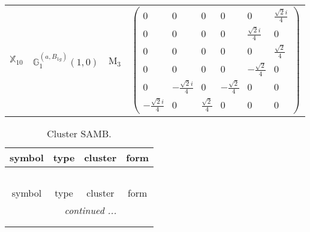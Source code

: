 \documentclass[fleqn,10pt,landscape]{article}
\begin{document}
\begin{itemize}
\begin{center}
\begin{longtable}{c|c|c|c}
$ \mathbb{X}_{10} $ & $\mathbb{G}_{1}^{(a,B_{1g})}(1,0)$ & M$_{3}$ & $\begin{pmatrix} 0 & 0 & 0 & 0 & 0 & \frac{\sqrt{2} i}{4} \\ 0 & 0 & 0 & 0 & \frac{\sqrt{2} i}{4} & 0 \\ 0 & 0 & 0 & 0 & 0 & \frac{\sqrt{2}}{4} \\ 0 & 0 & 0 & 0 & - \frac{\sqrt{2}}{4} & 0 \\ 0 & - \frac{\sqrt{2} i}{4} & 0 & - \frac{\sqrt{2}}{4} & 0 & 0 \\ - \frac{\sqrt{2} i}{4} & 0 & \frac{\sqrt{2}}{4} & 0 & 0 & 0 \end{pmatrix}$ \\
\end{longtable}
\end{center}
\begin{center}
\renewcommand{\arraystretch}{1.3}
\begin{longtable}{c|c|c|c}
\caption{Cluster SAMB.}
 \\
 \hline \hline
symbol & type & cluster & form \\ \hline \endfirsthead

\multicolumn{3}{l}{\tablename\ \thetable{}} \\
 \hline \hline
symbol & type & cluster & form \\ \hline \endhead

 \hline \hline
\multicolumn{3}{r}{\footnotesize\it continued ...} \\ \endfoot

 \hline \hline
\multicolumn{3}{r}{} \\ \endlastfoot


\end{longtable}
\end{center}
\end{itemize}
\end{document}
